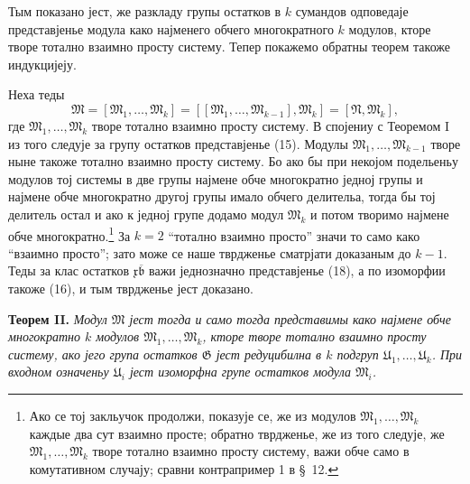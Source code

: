 ﻿\documentclass[11pt]{article}
\providecommand{\mM}{\mathfrak M}
\providecommand{\mN}{\mathfrak N}
\providecommand{\mG}{\mathfrak G}
\providecommand{\mU}{\mathfrak U}
\providecommand{\mb}{\mathfrak b}
\providecommand{\mx}{\mathfrak x}
\begin{document}
Тым показано јест, же разкладу групы остатков в \(k\) сумандов одповедаје представјенье модула како најменего обчего многократного \(k\) модулов, кторе творе тотално взаимно просту систему. Тепер покажемо обратны теорем такоже индукцијеју.

Неха теды
\[
 \mM=[\mM_1,\ldots,\mM_k]=[[\mM_1,\ldots,\mM_{k-1}],\mM_k]=[\mN,\mM_k],
\]
где \(\mM_1,\ldots,\mM_k\) творе тотално взаимно просту систему. В спојениу с Теоремом I из того следује за групу остатков представјенье (15). Модулы \(\mM_1,\ldots,\mM_{k-1}\) творе ныне такоже тотално взаимно просту систему. Бо ако бы при некојом подельеньу модулов тој системы в две групы најмене обче многократно једној групы и најмене обче многократно другој групы имало обчего делительа, тогда бы тој делитель остал и ако к једној групе додамо модул \(\mM_k\) и потом творимо најмене обче многократно.\footnote{Ако се тој закльучок продолжи, показује се, же из модулов \(\mM_1,\ldots,\mM_k\) каждые два сут взаимно просте; обратно тврдженье, же из того следује, же \(\mM_1,\ldots,\mM_k\) творе тотално взаимно просту систему, важи обче само в комутативном случају; сравни контрапример 1 в \S~12.} За \(k=2\) ``тотално взаимно просто'' значи то само како ``взаимно просто''; зато може се наше тврдженье сматрјати доказаным до \(k-1\). Теды за клас остатков \(\mx\overline{\mb}\) важи једнозначно представјенье (18), а по изоморфии такоже (16), и тым тврдженье јест доказано.

\textbf{Теорем II.} \textit{Модул \(\mM\) јест тогда и само тогда представимы како најмене обче многократно \(k\) модулов \(\mM_1,\ldots,\mM_k\), кторе творе тотално взаимно просту систему, ако јего група остатков \(\mG\) јест редуцибилна в \(k\) подгруп \(\mU_1,\ldots,\mU_k\). При входном означеньу \(\mU_i\) јест изоморфна групе остатков модула \(\mM_i\).}
\end{document}
